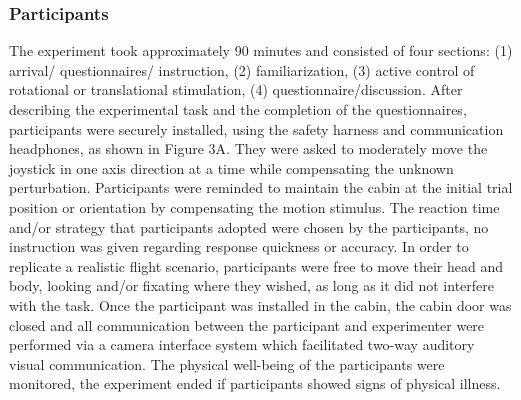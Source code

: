 \documentclass[11pt, onecolumn]{article}
\begin{document}
\subsubsection{Participants}
The experiment took approximately 90 minutes and consisted of four sections: (1) arrival/ questionnaires/ instruction, (2) familiarization, (3) active control of rotational or translational stimulation, (4) questionnaire/discussion.  After describing the experimental task and the completion of the questionnaires, participants were securely installed, using the safety harness and communication headphones, as shown in Figure 3A. They were asked to moderately move the joystick in one axis direction at a time while compensating the unknown perturbation.  Participants were reminded to maintain the cabin at the initial trial position or orientation by compensating the motion stimulus.  The reaction time and/or strategy that participants adopted were chosen by the participants, no instruction was given regarding response quickness or accuracy.  In order to replicate a realistic flight scenario, participants were free to move their head and body, looking and/or fixating where they wished, as long as it did not interfere with the task.  Once the participant was installed in the cabin, the cabin door was closed and all communication between the participant and experimenter were performed via a camera interface system which facilitated two-way auditory visual communication. The physical well-being of the participants were monitored, the experiment ended if participants showed signs of physical illness. 

\end{document}
